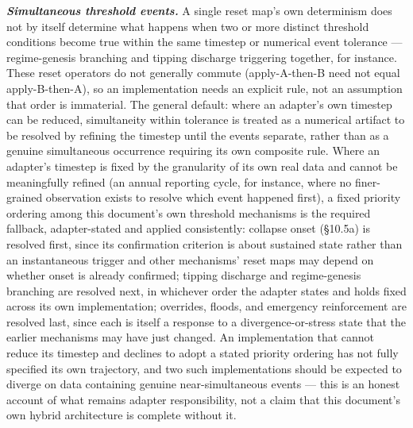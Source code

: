 \documentclass[
]{article}
\begin{document}
\emph{\textbf{Simultaneous threshold events.}} A single reset map's own
determinism does not by itself determine what happens when two or more
distinct threshold conditions become true within the same timestep or
numerical event tolerance --- regime-genesis branching and tipping
discharge triggering together, for instance. These reset operators do
not generally commute (apply-A-then-B need not equal apply-B-then-A), so
an implementation needs an explicit rule, not an assumption that order
is immaterial. The general default: where an adapter's own timestep can
be reduced, simultaneity within tolerance is treated as a numerical
artifact to be resolved by refining the timestep until the events
separate, rather than as a genuine simultaneous occurrence requiring its
own composite rule. Where an adapter's timestep is fixed by the
granularity of its own real data and cannot be meaningfully refined (an
annual reporting cycle, for instance, where no finer-grained observation
exists to resolve which event happened first), a fixed priority ordering
among this document's own threshold mechanisms is the required fallback,
adapter-stated and applied consistently: collapse onset (§10.5a) is
resolved first, since its confirmation criterion is about sustained
state rather than an instantaneous trigger and other mechanisms' reset
maps may depend on whether onset is already confirmed; tipping discharge
and regime-genesis branching are resolved next, in whichever order the
adapter states and holds fixed across its own implementation; overrides,
floods, and emergency reinforcement are resolved last, since each is
itself a response to a divergence-or-stress state that the earlier
mechanisms may have just changed. An implementation that cannot reduce
its timestep and declines to adopt a stated priority ordering has not
fully specified its own trajectory, and two such implementations should
be expected to diverge on data containing genuine near-simultaneous
events --- this is an honest account of what remains adapter
responsibility, not a claim that this document's own hybrid architecture
is complete without it.
\end{document}
